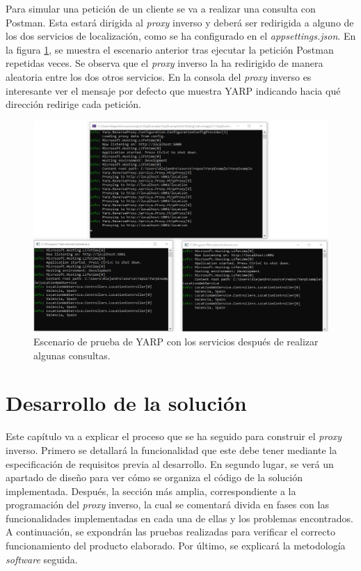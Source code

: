 \documentclass[11pt,spanish,listoffigures]{tfgetsinf}
\begin{document}
Para simular una petición de un cliente se va a realizar una consulta con Postman. Esta estará dirigida al \emph{proxy} inverso y deberá ser redirigida a alguno de los dos servicios de localización, como se ha configurado en el \emph{appsettings.json}. En la figura \ref{ejemploYARP_servicios_funcionando}, se muestra el escenario anterior tras ejecutar la petición Postman repetidas veces. Se observa que el \emph{proxy} inverso la ha redirigido de manera aleatoria entre los dos otros servicios. En la consola del \emph{proxy} inverso es interesante ver el mensaje por defecto que muestra YARP indicando hacia qué dirección redirige cada petición.

\begin{figure}[ht]
\centering
\includegraphics[width=1\textwidth]{imagenes/ejemploYARP/servicios_funcionando}
\caption{Escenario de prueba de YARP con los servicios después de realizar algunas consultas.}
	\label{ejemploYARP_servicios_funcionando}
\end{figure}


\chapter{Desarrollo de la solución}

Este capítulo va a explicar el proceso que se ha seguido para construir el \emph{proxy} inverso. Primero se detallará la funcionalidad que este debe tener mediante la especificación de requisitos previa al desarrollo. En segundo lugar, se verá un apartado de diseño para ver cómo se organiza el código de la solución implementada. Después, la sección más amplia, correspondiente a la programación del \emph{proxy} inverso, la cual se comentará divida en fases con las funcionalidades implementadas en cada una de ellas y los problemas encontrados. A continuación, se expondrán las pruebas realizadas para verificar el correcto funcionamiento del producto elaborado. Por último, se explicará la metodología \emph{software} seguida.
\end{document}
